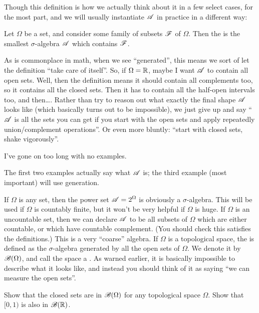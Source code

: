 Though this definition is how we actually think about it in a few select cases,
for the most part, and we will usually instantiate $\mathscr A$ in practice
in a different way:
\begin{definition}
	Let $\Omega$ be a set, and consider some family of subsets $\mathscr F$ of $\Omega$.
	Then the 
	is the smallest $\sigma$-algebra $\mathscr A$ which contains $\mathscr F$.
\end{definition}
As is commonplace in math, when we see ``generated'',
this means we sort of let the definition ``take care of itself''.
So, if $\Omega = \mathbb R$, maybe I want $\mathscr A$ to contain all open sets.
Well, then the definition means it should contain all complements too,
so it contains all the closed sets.
Then it has to contain all the half-open intervals too, and then\dots.
Rather than try to reason out what exactly the final shape $\mathscr A$ looks like
(which basically turns out to be impossible),
we just give up and say ``$\mathscr A$ is all the sets you can get if you start
with the open sets and apply repeatedly union/complement operations''.
Or even more bluntly: ``start with closed sets, shake vigorously''.

I've gone on too long with no examples.
\begin{example}
	The first two examples actually say what $\mathscr A$ is;
	the third example (most important) will use generation.
	\begin{enumerate}[(a)]
		\ii If $\Omega$ is any set,
		then the power set $\mathscr A = 2^{\Omega}$ is obviously a $\sigma$-algebra.
		This will be used if $\Omega$ is countably finite,
		but it won't be very helpful if $\Omega$ is huge.
		\ii If $\Omega$ is an uncountable set,
		then we can declare $\mathscr A$ to be all subsets of $\Omega$
		which are either countable,
		or which have countable complement.
		(You should check this satisfies the definitions.)
		This is a very ``coarse'' algebra.
		\ii If $\Omega$ is a topological space,
		the 
		is defined as the $\sigma$-algebra generated by all the open sets of $\Omega$.
		We denote it by $\mathscr B(\Omega)$,
		and call the space a .
		As warned earlier, it is basically impossible to describe
		what it looks like,
		and instead you should think of it as saying
		``we can measure the open sets''.
	\end{enumerate}
\end{example}
\begin{ques}
	Show that the closed sets are in $\mathscr B(\Omega)$ for
	any topological space $\Omega$.
	Show that $[0,1)$ %
	is also in $\mathscr B(\mathbb R)$.
\end{ques}

